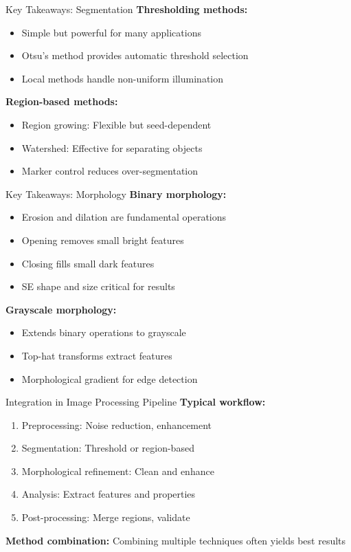 \documentclass[aspectratio=169,10pt]{beamer}
\begin{document}
\begin{frame}{Key Takeaways: Segmentation}
\textbf{Thresholding methods:}
\begin{itemize}
\item Simple but powerful for many applications
\item Otsu's method provides automatic threshold selection
\item Local methods handle non-uniform illumination
\end{itemize}

\textbf{Region-based methods:}
\begin{itemize}
\item Region growing: Flexible but seed-dependent
\item Watershed: Effective for separating objects
\item Marker control reduces over-segmentation
\end{itemize}
\end{frame}

\begin{frame}{Key Takeaways: Morphology}
\textbf{Binary morphology:}
\begin{itemize}
\item Erosion and dilation are fundamental operations
\item Opening removes small bright features
\item Closing fills small dark features
\item SE shape and size critical for results
\end{itemize}

\textbf{Grayscale morphology:}
\begin{itemize}
\item Extends binary operations to grayscale
\item Top-hat transforms extract features
\item Morphological gradient for edge detection
\end{itemize}
\end{frame}

\begin{frame}{Integration in Image Processing Pipeline}
\textbf{Typical workflow:}
\begin{enumerate}
\item Preprocessing: Noise reduction, enhancement
\item Segmentation: Threshold or region-based
\item Morphological refinement: Clean and enhance
\item Analysis: Extract features and properties
\item Post-processing: Merge regions, validate
\end{enumerate}

\textbf{Method combination:}
Combining multiple techniques often yields best results
\end{frame}
\end{document}
